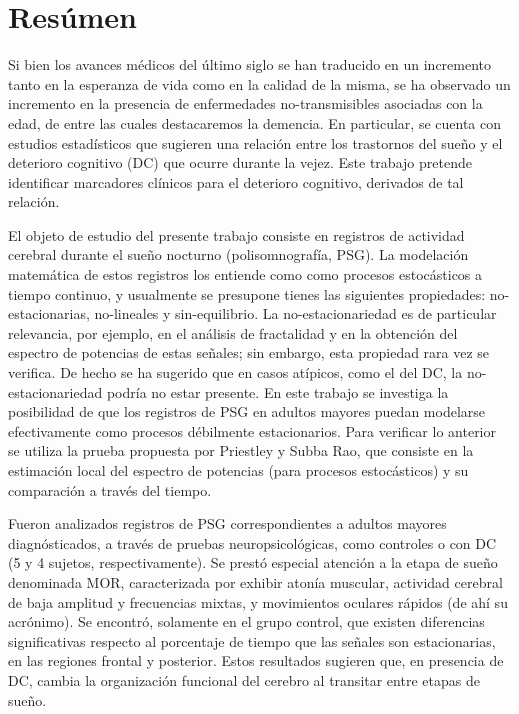 \documentclass[12pt,a4paper]{mitthesis}
\begin{document}
\setcounter{page}{1}

\chapter*{Res\'umen}

{\small


Si bien los avances m\'edicos del \'ultimo siglo se han traducido en un incremento tanto en la 
esperanza de vida como en la calidad de la misma, se ha observado \cite{PlanAlzheimer04} un 
incremento en la presencia de enfermedades no-transmisibles asociadas con la edad, de entre las 
cuales destacaremos la demencia.
En particular, se cuenta con estudios estad\'isticos \cite{Amer13,Miyata13,Potvin12} que sugieren 
una relaci\'on entre los trastornos del sue\~no y el deterioro cognitivo (DC) que ocurre durante 
la vejez.
Este trabajo pretende identificar marcadores cl\'inicos para el deterioro cognitivo, derivados de 
tal relaci\'on.

El objeto de estudio del presente trabajo consiste en registros de actividad cerebral durante el 
sue\~no nocturno (polisomnograf\'ia, PSG). La modelaci\'on matem\'atica de estos registros los 
entiende como como procesos estoc\'asticos a tiempo continuo, y usualmente se presupone tienes las 
siguientes propiedades: no-estacionarias, no-lineales y sin-equilibrio. La no-estacionariedad es de 
particular relevancia, por ejemplo, en el an\'alisis de fractalidad y en la obtenci\'on del 
espectro de potencias de estas se\~nales; sin embargo, esta propiedad rara vez se verifica.
De hecho se ha sugerido \cite{McEwen75,Cohen77,Sugimoto78} que en casos at\'ipicos, como el del DC, 
la no-estacionariedad podr\'ia no estar presente. 
En este trabajo se investiga la posibilidad de que los registros de PSG en adultos mayores puedan 
modelarse efectivamente como procesos d\'ebilmente estacionarios.
Para verificar lo anterior se utiliza la prueba propuesta por Priestley y Subba Rao, que consiste 
en la estimaci\'on local del espectro de potencias (para procesos estoc\'asticos) y su 
comparaci\'on a trav\'es del tiempo.

Fueron analizados registros de PSG correspondientes a adultos mayores diagn\'osticados, a trav\'es 
de pruebas neuropsicol\'ogicas, como controles o con DC (5 y 4 sujetos, respectivamente). 
Se prest\'o especial atenci\'on a la etapa de sue\~no denominada MOR, caracterizada por exhibir 
aton\'ia muscular, actividad cerebral de baja amplitud y frecuencias mixtas, y movimientos oculares 
r\'apidos (de ah\'i su acr\'onimo).
Se encontr\'o, solamente en el grupo control, que existen diferencias significativas respecto al 
porcentaje de tiempo que las se\~nales son estacionarias, en las regiones frontal y posterior.
Estos resultados sugieren que, en presencia de DC, cambia la organizaci\'on funcional del cerebro 
al transitar entre etapas de sue\~no.

}
\end{document}
